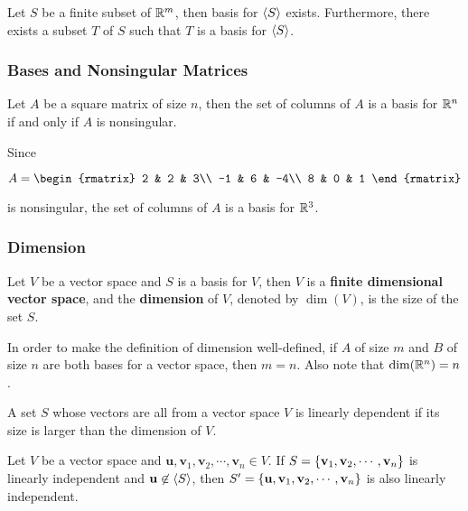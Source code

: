 \documentclass[a4paper,12pt]{article}
\begin{document}
\begin{thm}
  Let $S$ be a finite subset of $\mathbb{R}^{m}$, then basis for $\left\langle S\right\rangle$ exists. Furthermore, there exists a subset $T$ of $S$ such that $T$ is a basis for $\left\langle S\right\rangle$.
\end{thm}

\subsubsection{Bases and Nonsingular Matrices}
\begin{thm}
  Let $A$ be a square matrix of size $n$, then the set of columns of $A$ is a basis for $\mathbb{R}^{n}$ if and only if $A$ is nonsingular.
\end{thm}\n

\begin{exm}
  Since

  $$A=\begin{rmatrix}
    2 & 2 & 3\\
    -1 & 6 & -4\\
    8 & 0 & 1
  \end{rmatrix}$$\s

  is nonsingular, the set of columns of $A$ is a basis for $\mathbb{R}^{3}$.
\end{exm}

\subsubsection{Dimension}
\begin{dft}
  Let $V$ be a vector space and $S$ is a basis for $V$, then $V$ is a \textbf{finite dimensional vector space}, and the \textbf{dimension} of $V$, denoted by $\dim(V)$, is the size of the set $S$.
\end{dft}\n

In order to make the definition of dimension well-defined, if $A$ of size $m$ and $B$ of size $n$ are both bases for a vector space, then $m=n$. Also note that $\dim(\mathbb{R}^{n})=n$.\n

\begin{thm}
  A set $S$ whose vectors are all from a vector space $V$ is linearly dependent if its size is larger than the dimension of $V$.
\end{thm}\n

\begin{pst}
  Let $V$ be a vector space and $\mathbf{u},\mathbf{v}_{1},\mathbf{v}_{2},\cdots,\mathbf{v}_{n}\in V$. If $S=\left\{ \mathbf{v}_{1},\mathbf{v}_{2},\cdots,\mathbf{v}_{n}\right\}$ is linearly independent and $\mathbf{u}\not\in\left\langle S\right\rangle$, then $S'=\left\{ \mathbf{u},\mathbf{v}_{1},\mathbf{v}_{2},\cdots,\mathbf{v}_{n}\right\}$ is also linearly independent.
\end{pst}\n
\end{document}
